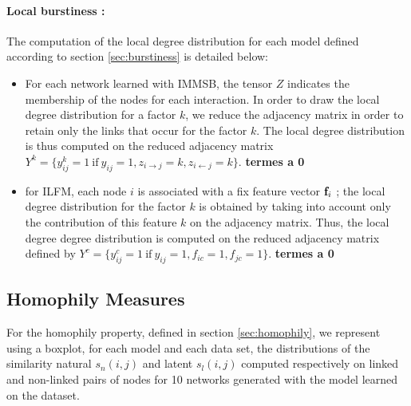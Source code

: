 \paragraph{Local burstiness : }
The computation of the local degree distribution for each model defined according to section \ref{sec:burstiness} is detailed below: 
\begin{itemize}
        \item For each network learned with IMMSB, the tensor $Z$ indicates the membership of the nodes for each  interaction. In order to draw the local degree distribution for a factor $k$, we reduce the adjacency matrix in order to retain only the links that occur for the factor $k$. The local degree distribution is thus computed on the reduced adjacency matrix  $Y^k =\{ y_{ij}^k=1 \ \textrm{if}\ y_{ij}=1 , z_{i\rightarrow j}=k, z_{i\leftarrow j}=k\}$. \textbf{termes a 0}
       \item for ILFM, each node $i$ is associated with a fix feature vector $\mathbf{f}_{i}$ ; the local degree distribution for the factor $k$ is obtained by taking into account only the contribution of this feature $k$ on the adjacency matrix. Thus, the local degree degree distribution is computed on the reduced adjacency matrix defined by $Y^c =\{ y_{ij}^c=1 \ \textrm{if}\ y_{ij}=1 , f_{ic}=1, f_{jc}=1\}$. \textbf{termes a 0}
\end{itemize}

\subsection{Homophily Measures}


For the homophily property, defined in section \ref{sec:homophily}, we represent using a boxplot, for each model and each data set, the distributions of the similarity natural $s_n(i,j)$ and latent $s_l(i,j)$ computed respectively on linked and non-linked pairs of nodes for 10 networks generated with the model learned on the dataset.


